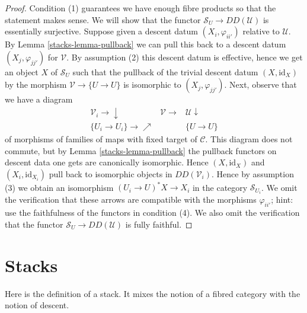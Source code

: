 \begin{proof}

Condition (1) guarantees we have enough fibre products so that
the statement makes sense.
We will show that the functor $\mathcal{S}_U \to DD(\mathcal{U})$ is
essentially surjective. Suppose given a descent datum
$(X_i, \varphi_{ii'})$ relative to $\mathcal{U}$.
By Lemma \ref{stacks-lemma-pullback} we can pull this back to a descent datum
$(X_j, \varphi_{jj'})$ for $\mathcal{V}$.
By assumption (2) this descent datum is effective, hence we
get an object $X$ of $\mathcal{S}_U$ such that the
pullback of the trivial descent datum $(X, \text{id}_X)$
by the morphism $\mathcal{V} \to \{U \to U\}$ is isomorphic to
$(X_j, \varphi_{jj'})$. Next, observe that we have a diagram
$$
\begin{array}{ccc}\mathcal{V}_i \longrightarrow\downarrow & \mathcal{V} \longrightarrow & \mathcal{U} \downarrow \\ \{U_i \to U_i\} \longrightarrow\nearrow &  & \{U \to U\}\end{array}
$$
of morphisms of families of maps with fixed target of $\mathcal{C}$.
This diagram does not commute, but by Lemma \ref{stacks-lemma-pullback}
the pullback functors on descent data one gets are canonically
isomorphic. Hence $(X, \text{id}_X)$ and $(X_i, \text{id}_{X_i})$
pull back to isomorphic objects in $DD(\mathcal{V}_i)$.
Hence by assumption (3) we obtain an isomorphism
$(U_i \to U)^*X \to X_i$ in the category $\mathcal{S}_{U_i}$.
We omit the verification that these arrows are compatible
with the morphisms $\varphi_{ii'}$; hint: use the faithfulness
of the functors in condition (4).
We also omit the verification that the functor
$\mathcal{S}_U \to DD(\mathcal{U})$ is
fully faithful.
\end{proof}

\section{Stacks}
\label{stacks-section-definition}
Here is the definition of a stack. It mixes the notion of a fibred
category with the notion of descent.

